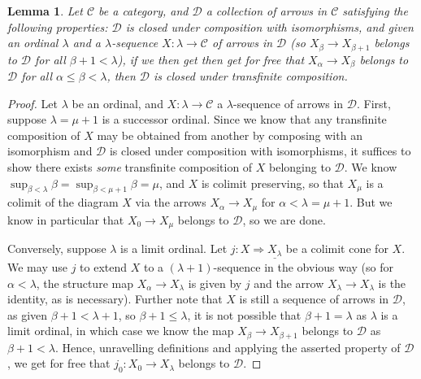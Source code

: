 \documentclass{amsart}
\theoremstyle{plain}
\newtheorem{lemma}[theorem]{Lemma}
\theoremstyle{definition}
\newcommand{\0}{\mathbf{0}}
\newcommand{\cC}{\mathcal C}
\newcommand{\cD}{\mathcal D}
\newcommand{\ul}{\underline}
\renewcommand{\(}{\left(}
\renewcommand{\)}{\right)}
\begin{document}
\begin{lemma}\label{condition_for_family_of_arrows_to_be_closed_under_transfinite_composition}
  Let $\cC$ be a category, and $\cD$ a collection of arrows in $\cC$ satisfying the following properties: $\cD$ is closed under composition with isomorphisms, and given an ordinal $\lambda$ and a $\lambda$-sequence $X:\lambda\to\cC$ of arrows in $\cD$ (so $X_\beta\to X_{\beta+1}$ belongs to $\cD$ for all $\beta+1<\lambda$), if we then get then get for free that $X_\alpha\to X_\beta$ belongs to $\cD$ for all $\alpha\leq\beta<\lambda$, then $\cD$ is closed under transfinite composition.
\end{lemma}
\begin{proof}
  Let $\lambda$ be an ordinal, and $X:\lambda\to\cC$ a $\lambda$-sequence of arrows in $\cD$. First, suppose $\lambda=\mu+1$ is a successor ordinal. Since we know that any transfinite composition of $X$ may be obtained from another by composing with an isomorphism and $\cD$ is closed under composition with isomorphisms, it suffices to show there exists \textit{some} transfinite composition of $X$ belonging to $\cD$. We know $\sup_{\beta<\lambda}\beta=\sup_{\beta<\mu+1}\beta=\mu$, and $X$ is colimit preserving, so that $X_\mu$ is a colimit of the diagram $X$ via the arrows $X_{\alpha}\to X_\mu$ for $\alpha<\lambda=\mu+1$. But we know in particular that $X_0\to X_\mu$ belongs to $\cD$, so we are done.
 
  Conversely, suppose $\lambda$ is a limit ordinal. Let $j:X\Rightarrow\ul{X_\lambda}$ be a colimit cone for $X$. We may use $j$ to extend $X$ to a $(\lambda+1)$-sequence in the obvious way (so for $\alpha<\lambda$, the structure map $X_\alpha\to X_\lambda$ is given by $j$ and the arrow $X_\lambda\to X_\lambda$ is the identity, as is necessary). Further note that $X$ is still a sequence of arrows in $\cD$, as given $\beta+1<\lambda+1$, so $\beta+1\leq\lambda$, it is not possible that $\beta+1=\lambda$ as $\lambda$ is a limit ordinal, in which case we know the map $X_\beta\to X_{\beta+1}$ belongs to $\cD$ as $\beta+1<\lambda$. Hence, unravelling definitions and applying the asserted property of $\cD$, we get for free that $j_0:X_0\to X_\lambda$ belongs to $\cD$.
\end{proof}
\end{document}
